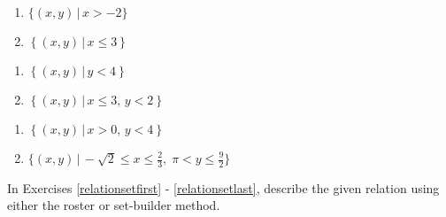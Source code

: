 \begin{multicols}{2}
\begin{enumerate}
\setcounter{enumi}{\value{HW}}

\item $\{ (x, y) \, | \, x > -2 \}$
\item  $\left\{ \left(x,y \right) \, | \, x \leq 3 \right\}$

\setcounter{HW}{\value{enumi}}
\end{enumerate}
\end{multicols}

\begin{multicols}{2}
\begin{enumerate}
\setcounter{enumi}{\value{HW}}

\item  $\left\{ \left(x,y \right) \, | \, y < 4 \right\}$
\item  $\left\{ \left(x,y \right) \, | \, x \leq 3, \, y < 2 \right\}$

\setcounter{HW}{\value{enumi}}
\end{enumerate}
\end{multicols}

\begin{multicols}{2}
\begin{enumerate}
\setcounter{enumi}{\value{HW}}

\item  $\left\{ \left(x,y \right) \, | \, x > 0, \, y < 4 \right\}$
\item $\{ (x, y) \, | \, -\sqrt{2} \leq x \leq \frac{2}{3}, \; \pi < y \leq \frac{9}{2} \}$ \label{relationlast}

\setcounter{HW}{\value{enumi}}
\end{enumerate}
\end{multicols}


In Exercises \ref{relationsetfirst} - \ref{relationsetlast}, describe the given relation using either the roster or set-builder method.



